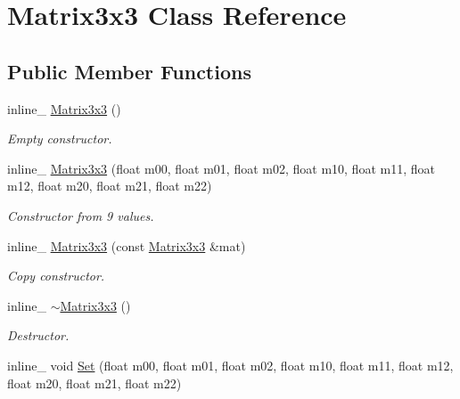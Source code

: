 \hypertarget{class_matrix3x3}{\section{Matrix3x3 Class Reference}
\label{class_matrix3x3}
}
\subsection*{Public Member Functions}
\begin{DoxyCompactItemize}
\item 
\hypertarget{class_matrix3x3_ad29ce73053fb451f5de0debb2959e72e}{inline\+\_\+ \hyperlink{class_matrix3x3_ad29ce73053fb451f5de0debb2959e72e}{Matrix3x3} ()}\label{class_matrix3x3_ad29ce73053fb451f5de0debb2959e72e}

\begin{DoxyCompactList}\small\item\em Empty constructor. \end{DoxyCompactList}\item 
\hypertarget{class_matrix3x3_a005fba917326df36dc28fadd7f54e4d8}{inline\+\_\+ \hyperlink{class_matrix3x3_a005fba917326df36dc28fadd7f54e4d8}{Matrix3x3} (float m00, float m01, float m02, float m10, float m11, float m12, float m20, float m21, float m22)}\label{class_matrix3x3_a005fba917326df36dc28fadd7f54e4d8}

\begin{DoxyCompactList}\small\item\em Constructor from 9 values. \end{DoxyCompactList}\item 
\hypertarget{class_matrix3x3_ade9bc27bcc432ce3543cda754ed0cf4a}{inline\+\_\+ \hyperlink{class_matrix3x3_ade9bc27bcc432ce3543cda754ed0cf4a}{Matrix3x3} (const \hyperlink{class_matrix3x3}{Matrix3x3} \&mat)}\label{class_matrix3x3_ade9bc27bcc432ce3543cda754ed0cf4a}

\begin{DoxyCompactList}\small\item\em Copy constructor. \end{DoxyCompactList}\item 
\hypertarget{class_matrix3x3_a596ea10f85a00caa0940275c9bd830a5}{inline\+\_\+ \hyperlink{class_matrix3x3_a596ea10f85a00caa0940275c9bd830a5}{$\sim$\+Matrix3x3} ()}\label{class_matrix3x3_a596ea10f85a00caa0940275c9bd830a5}

\begin{DoxyCompactList}\small\item\em Destructor. \end{DoxyCompactList}\item 
\hypertarget{class_matrix3x3_a58ebc2c0d6b582fb7eb6bb3b78c97ad6}{inline\+\_\+ void \hyperlink{class_matrix3x3_a58ebc2c0d6b582fb7eb6bb3b78c97ad6}{Set} (float m00, float m01, float m02, float m10, float m11, float m12, float m20, float m21, float m22)}\label{class_matrix3x3_a58ebc2c0d6b582fb7eb6bb3b78c97ad6}


\end{DoxyCompactItemize}

